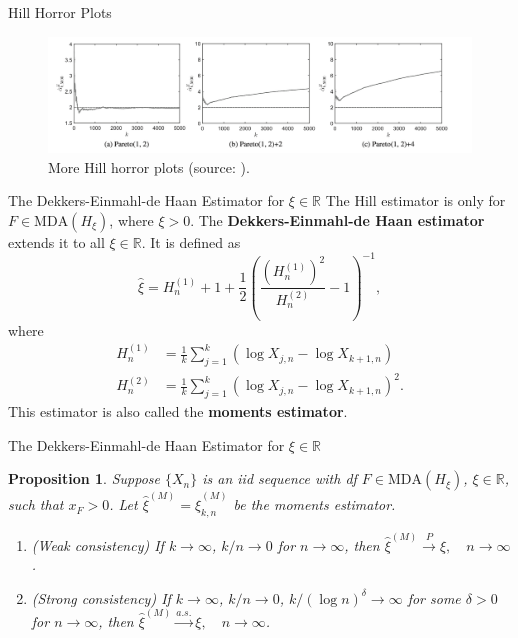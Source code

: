 \documentclass{beamer}
\newcommand{\MDA}{\text{MDA}}
\newtheorem{proposition}{Proposition}
\begin{document}
\begin{frame}{Hill Horror Plots}
    \begin{figure}
        \centering
        \includegraphics[scale=0.3]{hill_horror_plots2.png}
        \caption{More Hill horror plots (source: \cite{nair_et_al_2022}).}
        \label{fig:hill_horror_plots2}
    \end{figure}
\end{frame}

\begin{frame}{The Dekkers-Einmahl-de Haan Estimator for $\xi \in \mathbb{R}$}
    The Hill estimator is only for $F \in \MDA(H_{\xi})$, where $\xi > 0$. The \textbf{Dekkers-Einmahl-de Haan estimator} extends it to all $\xi \in \mathbb{R}$. It is defined as
    \[
    \hat{\xi} = H_n^{(1)} + 1 + \frac{1}{2}\left(\frac{(H_n^{(1)})^2}{H_n^{(2)}} - 1\right)^{-1},
    \]
    where
    \begin{align*}
        H_n^{(1)} &= \frac{1}{k}\sum_{j = 1}^k (\log X_{j, n} - \log X_{k + 1, n}) \\
        H_n^{(2)} &= \frac{1}{k}\sum_{j = 1}^k (\log X_{j, n} - \log X_{k + 1, n})^2.
    \end{align*}
    This estimator is also called the \textbf{moments estimator}. 
\end{frame}

\begin{frame}{The Dekkers-Einmahl-de Haan Estimator for $\xi \in \mathbb{R}$}
    \begin{proposition}
        Suppose $\{X_n\}$ is an iid sequence with df $F \in \MDA(H_{\xi})$, $\xi \in \mathbb{R}$, such that $x_F > 0$. Let $\hat{\xi}^{(M)} = \hat{\xi}_{k, n}^{(M)}$ be the moments estimator.
        \begin{enumerate}
            \item[(a)] (Weak consistency) If $k \to \infty$, $k / n \to 0$ for $n \to \infty$, then $\hat{\xi}^{(M)} \xrightarrow{P} \xi, \quad n \to \infty$.
            \item[(b)] (Strong consistency) If $k \to \infty$, $k / n \to 0$, $k /(\log n)^{\delta} \to \infty$ for some $\delta > 0$ for $n \to \infty$, then 
            $\hat{\xi}^{(M)} \xrightarrow{a.s.} \xi, \quad n \to \infty$.
        \end{enumerate}
    \end{proposition}    
\end{frame}
\end{document}
